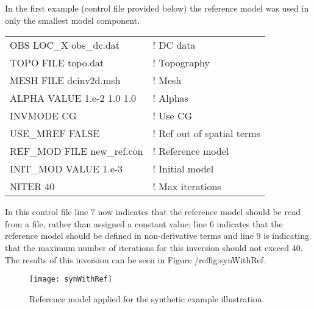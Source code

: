 In the first example (control file provided below) the reference model was used in only the smallest model component.
%
\begin{fileExample}
\begin{tabular}{|ll|}
\hline
OBS LOC\_X obs\_dc.dat & ! DC data \\
TOPO FILE topo.dat & ! Topography\\
MESH FILE dcinv2d.msh & ! Mesh \\
ALPHA VALUE 1.e-2 1.0 1.0 & ! Alphas \\
INVMODE CG & ! Use CG \\
USE\_MREF FALSE & ! Ref out of spatial terms \\
REF\_MOD FILE new\_ref.con & ! Reference model \\
INIT\_MOD VALUE 1.e-3 & ! Initial model \\
NITER 40 & ! Max iterations \\
\hline
\end{tabular}
\end{fileExample}
%
In this control file line 7 now indicates that the reference model should be read from a file, rather than assigned a constant value; line 6 indicates that the reference model should be defined in non-derivative terms and line 9 is indicating that the maximum number of iterations for this inversion should not exceed 40. The results of this inversion can be seen in Figure /ref{fig:synWithRef}.
%
\begin{figure}
\centering
\texttt{[image: synWithRef]}
\caption{Reference model applied for the synthetic example illustration.}
\label{fig:synWithRef}
\end{figure}

